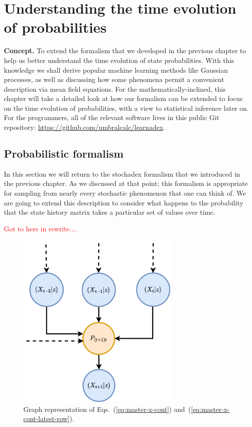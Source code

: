 \chapter{\sffamily Understanding the time evolution of probabilities}

{\bfseries\sffamily Concept.} To extend the formalism that we developed in the previous chapter to help us better understand the time evolution of state probabilities. With this knowledge we shall derive popular machine learning methods like Gaussian processes, as well as discussing how some phenomena permit a convenient description via mean field equations. For the mathematically-inclined, this chapter will take a detailed look at how our formalism can be extended to focus on the time evolution of probabilities, with a view to statistical inference later on. For the programmers, all of the relevant software lives in this public Git repository: \href{https://github.com/umbralcalc/learndadex}{https://github.com/umbralcalc/learnadex}.

\section{\sffamily Probabilistic formalism}

In this section we will return to the stochadex formalism that we introduced in the previous chapter. As we discussed at that point; this formalism is appropriate for sampling from nearly every stochastic phenomenon that one can think of. We are going to extend this description to consider what happens to the probability that the state history matrix takes a particular set of values over time.

\textcolor{red}{Got to here in rewrite....}

\begin{figure}[h]
\centering
\includegraphics[width=8cm]{images/chapter-3-master-eq-graph.drawio.png}
\caption{Graph representation of Eqs.~(\ref{eq:master-x-cont}) and~(\ref{eq:master-x-cont-latest-row}).}
\label{fig:master-eqn}
\end{figure} 

